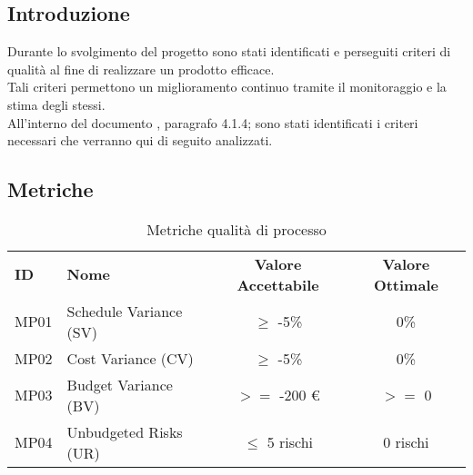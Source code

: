 

\subsection{Introduzione}
Durante lo svolgimento del progetto sono stati identificati e perseguiti criteri di qualità al fine di realizzare un prodotto efficace. \\
Tali criteri permettono un miglioramento continuo tramite il monitoraggio e la stima degli stessi.\\
All'interno del documento , paragrafo 4.1.4; sono stati identificati i criteri necessari che verranno qui di seguito analizzati.
\subsection{Metriche}

\begin{table} [h!]
	\begin{center}
		\begin{tabular} {m{2 cm} m{7 cm} c c }
			\rowcolor{lightgray}
			\textbf{ID} & \textbf{Nome}& \textbf{Valore Accettabile} & \textbf{Valore Ottimale}\\
			MP01 & Schedule Variance (SV)   & $\geq$ -5\%    & 0\% \\
			MP02 & Cost Variance (CV)   & $\geq$ -5\% & 0\% \\
			MP03 & Budget Variance (BV) & $>=$ -200 \euro & $>=$ 0 \\
			MP04 & Unbudgeted Risks (UR)   & $\leq$ 5 rischi & 0 rischi\\

		\end{tabular}
	\caption{Metriche qualità di processo}
	\end{center}
\end{table}
